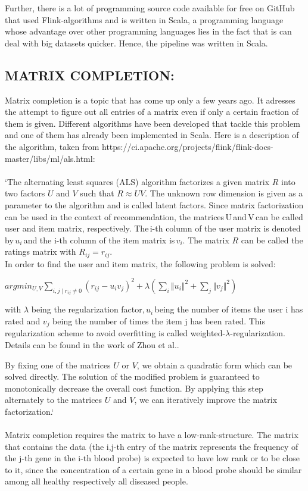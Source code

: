 \documentclass{bioinfo}
\begin{document}
Further, there is a lot of programming source code available for free on GitHub that used Flink-algorithms and is written in Scala, a programming language whose advantage over other programming languages lies in the fact that is can deal with big datasets quicker. Hence, the pipeline was written in Scala.\\

 

\subsection{MATRIX COMPLETION: }
\label{matrixcompletion_algo}

  

Matrix completion is a topic that has come up only a few years ago. It adresses the attempt to figure out all entries of a matrix even if only a certain fraction of them is given. Different algorithms have been developed that tackle this problem and one of them has already been implemented in Scala. Here is a description of the algorithm, taken from https://ci.apache.org/projects/flink/flink-docs-master/libs/ml/als.html: \\\\
`The alternating least squares (ALS) algorithm factorizes a given matrix $R$ into two factors $U$ and $V$ such that $R\approx UV$. The unknown row dimension is given as a parameter to the algorithm and is called latent factors. Since matrix factorization can be used in the context of recommendation, the matrices U and V can be called user and item matrix, respectively. The i-th column of the user matrix is denoted by $u_i$ and the i-th column of the item matrix is $v_i$. The matrix $R$ can be called the ratings matrix with $R_{ij} =r_{ij}$.\\
In order to find the user and item matrix, the following problem is solved: 

$ argmin_{U,V} \sum_{i,j\mid r_{ij} \neq0}(r_{ij}−u_i v_j)^{2}+\lambda(\sum_i \Vert u_i\Vert ^{2}+\sum_j \Vert v_j \Vert ^{2}) $

with $\lambda$ being the regularization factor, $u_i$ being the number of items the user i has rated and $v_j$ being the number of times the item j has been rated. This regularization scheme to avoid overfitting is called weighted-$\lambda$-regularization. Details can be found in the work of Zhou et al.. 

By fixing one of the matrices $U$ or $V$, we obtain a quadratic form which can be solved directly. The solution of the modified problem is guaranteed to monotonically decrease the overall cost function. By applying this step alternately to the matrices $U$ and $V$, we can iteratively improve the matrix factorization.`\\\\
Matrix completion requires the matrix to have a low-rank-structure. The matrix that contains the data (the i,j-th entry of the matrix represents the frequency of the j-th gene in the i-th blood probe) is expected to have low rank or to be close to it, since the concentration of a certain gene in a blood probe should be similar among all healthy respectively all diseased people. 
\end{document}
